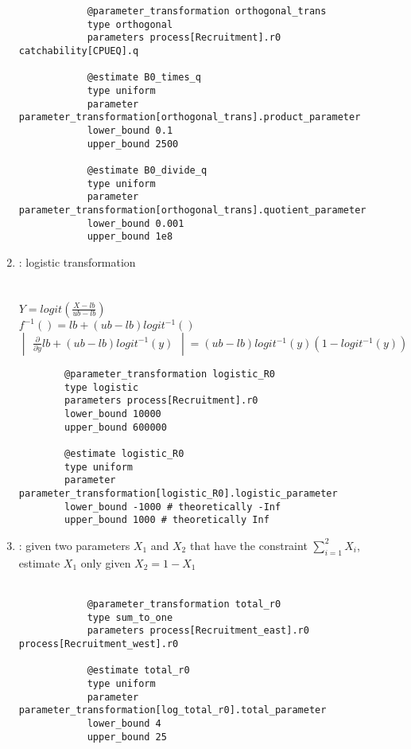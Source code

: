 \begin{enumerate}
{\small{\begin{verbatim}
			@parameter_transformation orthogonal_trans
			type orthogonal
			parameters process[Recruitment].r0 catchability[CPUEQ].q
			
			@estimate B0_times_q
			type uniform
			parameter parameter_transformation[orthogonal_trans].product_parameter
			lower_bound 0.1
			upper_bound 2500
			
			@estimate B0_divide_q
			type uniform
			parameter parameter_transformation[orthogonal_trans].quotient_parameter
			lower_bound 0.001
			upper_bound 1e8	
\end{verbatim}}}

\item {}  : logistic transformation\\
\\
\\
$Y = logit(\frac{X - lb}{ub - lb})$\\
$f^{-1}() = lb +(ub - lb)  logit^{-1}()$
\[
 \begin{vmatrix} \frac{\partial}{\partial y}   lb +(ub - lb)  logit^{-1}(y) \end{vmatrix} =  (ub - lb)logit^{-1}(y)\left(1 - logit^{-1}(y)\right) 
\]
\label{sec:Transformation-Logistic}
{\small{\begin{verbatim}
		@parameter_transformation logistic_R0
		type logistic
		parameters process[Recruitment].r0
		lower_bound 10000
		upper_bound 600000
		
		@estimate logistic_R0
		type uniform
		parameter parameter_transformation[logistic_R0].logistic_parameter
		lower_bound -1000 # theoretically -Inf
		upper_bound 1000 # theoretically Inf
		\end{verbatim}}}
	
\item {} : given two parameters $X_1$ and $X_2$ that have the constraint $\sum_{i = 1}^2X_i$, estimate $X_1$ only given $X_2 = 1 - X_1$\\
\\
\label{sec:Transformation-SumToOne}
{\small{\begin{verbatim}
			@parameter_transformation total_r0
			type sum_to_one
			parameters process[Recruitment_east].r0 process[Recruitment_west].r0
			
			@estimate total_r0
			type uniform
			parameter parameter_transformation[log_total_r0].total_parameter
			lower_bound 4
			upper_bound 25
			

\end{verbatim}}}
\end{enumerate}
